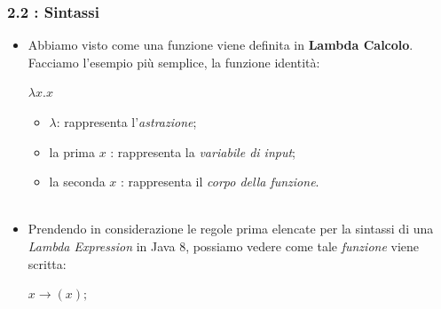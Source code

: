 \documentclass{beamer}
\begin{document}
\begin{frame}
	\frametitle{\textbf{2.2 : Sintassi}}
	\begin{itemize}
		\item
			Abbiamo visto come una funzione viene definita in \textbf{Lambda Calcolo}. Facciamo l'esempio più semplice, la funzione identità:
			\begin{center}
				\Large$\lambda x.x$
			\end{center}
			\begin{itemize}
				\item
					\Large$\lambda$: rappresenta l'\textit{astrazione};
				\item
					la prima \Large $x$ : rappresenta la \textit{variabile di input};
				\item
					la seconda \Large $x$ : rappresenta il  \textit{corpo della funzione}.\\\
			\end{itemize}	
		\item
			Prendendo in considerazione le regole prima elencate per la sintassi di una \textit{Lambda Expression} in Java 8, possiamo vedere come tale \textit{funzione} viene scritta:
			\begin{center}
				\Large$x\rightarrow(x);$
			\end{center}									
	\end{itemize}
\end{frame}


\begin{frame}
\end{frame}


\begin{frame}
\end{frame}


\begin{frame}
\end{frame}


\begin{frame}
\end{frame}

\end{document}
